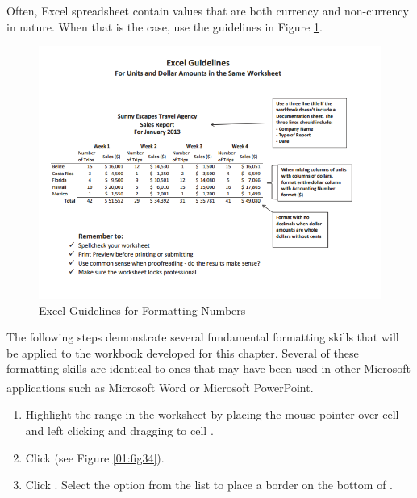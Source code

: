 Often, Excel spreadsheet contain values that are both currency and non-currency in nature. When that is the case, use the guidelines in Figure \ref{01:fig33}.

\begin{figure}[H]
	\centering
	\includegraphics[width=\maxwidth{.95\linewidth}]{gfx/ch01_fig33}
	\caption{Excel Guidelines for Formatting Numbers}
	\label{01:fig33}
\end{figure}

The following steps demonstrate several fundamental formatting skills that will be applied to the workbook developed for this chapter. Several of these formatting skills are identical to ones that may have been used in other Microsoft applications such as Microsoft\textsuperscript{\textregistered} Word\textsuperscript{\textregistered} or Microsoft\textsuperscript{\textregistered} PowerPoint\textsuperscript{\textregistered}.

\begin{enumbox}
	\begin{enumerate}
		\item Highlight the range  in the  worksheet by placing the mouse pointer over cell  and left clicking and dragging to cell . 
		\item Click  (see Figure \ref{01:fig34}).
		\item Click . Select the  option from the list to place a border on the bottom of .
	\end{enumerate}
\end{enumbox}

